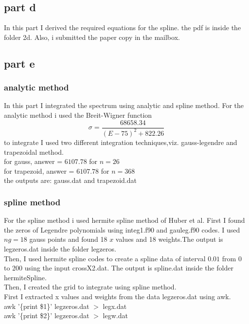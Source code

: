 \documentclass[11pt,a4paper,english]{article}
\newcommand{\bdm}{\begin{displaymath}}
\newcommand{\edm}{\end{displaymath}}
\begin{document}
	
	\subsection{part d}
	In this part I derived the required equations for the spline.
	the pdf is inside the folder 2d. Also, i submitted the paper copy in the mailbox.
	
	\subsection{part e}
	\subsubsection{analytic method}
In this part I integrated the spectrum using analytic and spline method. For the analytic method i used the Breit-Wigner function\\
\bdm
\sigma = \frac{68658.34}{(E-75)^{2}+822.26}
\edm
to integrate I used two different integration techniques,viz. gauss-legendre and trapezoidal method.\\
for gauss,     answer = $6107.78$ for $n=26$\\
for trapezoid, answer = $6107.78$ for $n=368$\\
the outputs are: gauss.dat and trapezoid.dat\\

\subsubsection{spline method}

For the spline method i used hermite spline method of Huber et al.
First I found the zeros of Legendre polynomials using integ1.f90 and gauleg.f90 codes. I used $ng=18$ gauss points and found 18 $x$ values and 18 weights.The output is legzeros.dat inside the folder legzeros.\\

Then, I used hermite spline codes to create a spline data of interval $0.01$ from 0 to 200 using the input crossX2.dat. The output is spline.dat inside the folder hermiteSpline.\\

Then, I created the grid to integrate using spline method.\\
First I extracted x values and weights from the data legzeros.dat using awk.\\
awk '\{print \$1\}' legzeros.dat $>$ legx.dat \\
awk '\{print \$2\}' legzeros.dat $>$ legw.dat \\
\end{document}
